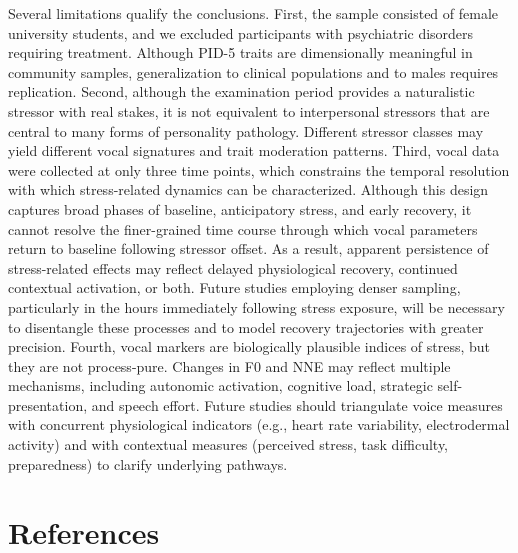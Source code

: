 \documentclass[
  english,
  man]{apa6}
\begin{document}
Several limitations qualify the conclusions. First, the sample consisted of female university students, and we excluded participants with psychiatric disorders requiring treatment. Although PID-5 traits are dimensionally meaningful in community samples, generalization to clinical populations and to males requires replication. Second, although the examination period provides a naturalistic stressor with real stakes, it is not equivalent to interpersonal stressors that are central to many forms of personality pathology. Different stressor classes may yield different vocal signatures and trait moderation patterns. Third, vocal data were collected at only three time points, which constrains the temporal resolution with which stress-related dynamics can be characterized. Although this design captures broad phases of baseline, anticipatory stress, and early recovery, it cannot resolve the finer-grained time course through which vocal parameters return to baseline following stressor offset. As a result, apparent persistence of stress-related effects may reflect delayed physiological recovery, continued contextual activation, or both. Future studies employing denser sampling, particularly in the hours immediately following stress exposure, will be necessary to disentangle these processes and to model recovery trajectories with greater precision. Fourth, vocal markers are biologically plausible indices of stress, but they are not process-pure. Changes in F0 and NNE may reflect multiple mechanisms, including autonomic activation, cognitive load, strategic self-presentation, and speech effort. Future studies should triangulate voice measures with concurrent physiological indicators (e.g., heart rate variability, electrodermal activity) and with contextual measures (perceived stress, task difficulty, preparedness) to clarify underlying pathways.

\newpage

\section{References}\label{references}
\end{document}
